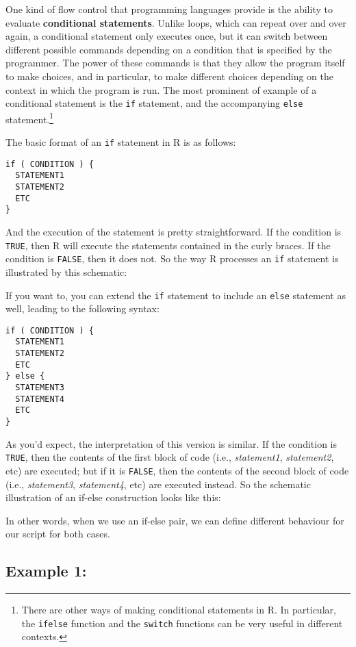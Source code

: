 \documentclass[]{book}
\let\rmarkdownfootnote\footnote%
\def\footnote{\protect\rmarkdownfootnote}
\begin{document}
One kind of flow control that programming languages provide is the ability to evaluate \textbf{conditional statements}. Unlike loops, which can repeat over and over again, a conditional statement only executes once, but it can switch between different possible commands depending on a condition that is specified by the programmer. The power of these commands is that they allow the program itself to make choices, and in particular, to make different choices depending on the context in which the program is run. The most prominent of example of a conditional statement is the \texttt{if} statement, and the accompanying \texttt{else} statement.\footnote{There are other ways of making conditional statements in R. In particular, the \texttt{ifelse} function and the \texttt{switch} functions can be very useful in different contexts.}

The basic format of an \texttt{if} statement in R is as follows:

\begin{verbatim}
if ( CONDITION ) {
  STATEMENT1
  STATEMENT2
  ETC 
}
\end{verbatim}

And the execution of the statement is pretty straightforward. If the condition is \texttt{TRUE}, then R will execute the statements contained in the curly braces. If the condition is \texttt{FALSE}, then it does not. So the way R processes an \texttt{if} statement is illustrated by this schematic:

If you want to, you can extend the \texttt{if} statement to include an \texttt{else} statement as well, leading to the following syntax:

\begin{verbatim}
if ( CONDITION ) {
  STATEMENT1
  STATEMENT2
  ETC
} else {
  STATEMENT3
  STATEMENT4
  ETC
}
\end{verbatim}

As you'd expect, the interpretation of this version is similar. If the condition is \texttt{TRUE}, then the contents of the first block of code (i.e., \emph{statement1}, \emph{statement2}, etc) are executed; but if it is \texttt{FALSE}, then the contents of the second block of code (i.e., \emph{statement3}, \emph{statement4}, etc) are executed instead. So the schematic illustration of an if-else construction looks like this:

In other words, when we use an if-else pair, we can define different behaviour for our script for both cases.

\hypertarget{example-1}{%
\subsection{Example 1:}\label{example-1}}
\end{document}
